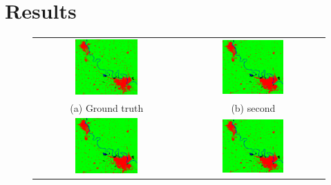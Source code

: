 \documentclass[12pt, a4paper]{report}
\begin{document}
\chapter{Results}
\begin{figure}
\begin{center}
\begin{tabular}{cc}
  \includegraphics[width=0.45\textwidth]{train_gt} &   \includegraphics[width=0.45\textwidth]{train_cnn} \\
(a) Ground truth & (b) second \\[6pt]
 \includegraphics[width=0.45\textwidth]{train_cnn} &   \includegraphics[width=0.45\textwidth]{train_cnn} \\

\end{tabular}
\end{center}
\end{figure}
\end{document}
